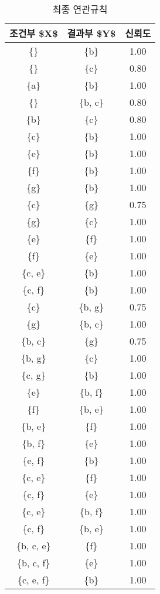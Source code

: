 \documentclass[]{book}
\begin{document}
\begin{table}[t]

\caption{\label{tab:confident-rules}최종 연관규칙}
\centering
\begin{tabular}{ccc}
\toprule
조건부 \$X\$ & 결과부 \$Y\$ & 신뢰도\\
\midrule
\{\} & \{b\} & 1.00\\
\{\} & \{c\} & 0.80\\
\{a\} & \{b\} & 1.00\\
\{\} & \{b, c\} & 0.80\\
\{b\} & \{c\} & 0.80\\
\addlinespace
\{c\} & \{b\} & 1.00\\
\{e\} & \{b\} & 1.00\\
\{f\} & \{b\} & 1.00\\
\{g\} & \{b\} & 1.00\\
\{c\} & \{g\} & 0.75\\
\addlinespace
\{g\} & \{c\} & 1.00\\
\{e\} & \{f\} & 1.00\\
\{f\} & \{e\} & 1.00\\
\{c, e\} & \{b\} & 1.00\\
\{c, f\} & \{b\} & 1.00\\
\addlinespace
\{c\} & \{b, g\} & 0.75\\
\{g\} & \{b, c\} & 1.00\\
\{b, c\} & \{g\} & 0.75\\
\{b, g\} & \{c\} & 1.00\\
\{c, g\} & \{b\} & 1.00\\
\addlinespace
\{e\} & \{b, f\} & 1.00\\
\{f\} & \{b, e\} & 1.00\\
\{b, e\} & \{f\} & 1.00\\
\{b, f\} & \{e\} & 1.00\\
\{e, f\} & \{b\} & 1.00\\
\addlinespace
\{c, e\} & \{f\} & 1.00\\
\{c, f\} & \{e\} & 1.00\\
\{c, e\} & \{b, f\} & 1.00\\
\{c, f\} & \{b, e\} & 1.00\\
\{b, c, e\} & \{f\} & 1.00\\
\addlinespace
\{b, c, f\} & \{e\} & 1.00\\
\{c, e, f\} & \{b\} & 1.00\\
\bottomrule
\end{tabular}
\end{table}
\end{document}
